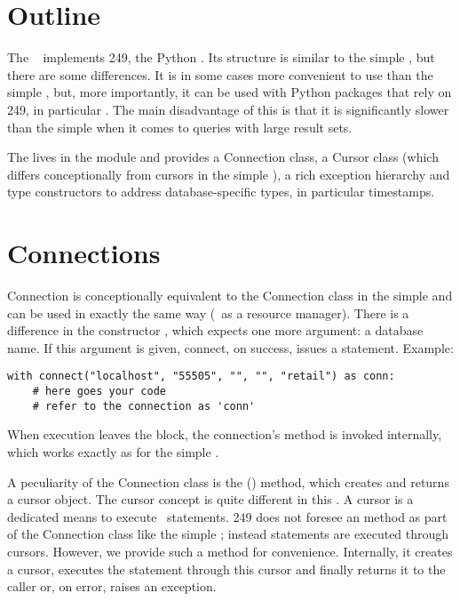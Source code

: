 \section{Outline}
The \nowdb\  implements
 249, the Python .
Its structure is similar to the simple ,
but there are some differences.
It is in some cases more convenient to use
than the simple , but, more importantly,
it can be used with Python packages that rely on
 249, in particular .
The main disadvantage of this  is
that it is significantly slower
than the simple 
when it comes to queries with large result sets.

The  lives in the module 
and provides a Connection class,
a Cursor class (which differs conceptionally
from cursors in the simple ),
a rich exception hierarchy and type constructors
to address database-specific types,
in particular timestamps.

\section{Connections}
Connection is conceptionally equivalent
to the Connection class in the simple 
and can be used in exactly the same way (\eg\
as a resource manager).
There is a difference in the constructor
, which expects one more argument:
a database name. If this argument is given,
connect, on success, issues a  statement.
Example:

\begin{python}
\begin{lstlisting}
with connect("localhost", "55505", "", "", "retail") as conn:
    # here goes your code
    # refer to the connection as 'conn'
\end{lstlisting}
\end{python}

When execution leaves the  block,
the connection's  method is invoked internally,
which works exactly as for the simple .

A peculiarity of the Connection class is the () method,
which creates and returns a cursor object.
The cursor concept is quite different in this .
A cursor is a dedicated means to execute \sql\ statements.
 249 does not foresee
an  method as part of the Connection class
like the simple ;
instead statements are executed through cursors.
However, we provide such a method for convenience.
Internally, it creates a cursor, executes the statement
through this cursor and finally returns it to the caller
or, on error, raises an exception.

